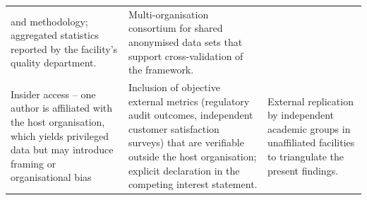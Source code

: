 \begin{table}[t]
\begin{tabularx}{\textwidth}{@{}p{3.5cm} X X@{}}
    and methodology; aggregated statistics reported by the facility's
    quality department. &
    Multi-organisation consortium for shared anonymised data sets that
    support cross-validation of the framework. \\
    \addlinespace
    Insider access -- one author is affiliated with the host organisation,
    which yields privileged data but may introduce framing or
    organisational bias &
    Inclusion of objective external metrics (regulatory audit outcomes,
    independent customer satisfaction surveys) that are verifiable
    outside the host organisation; explicit declaration in the competing
    interest statement. &
    External replication by independent academic groups in unaffiliated
    \MRO{} facilities to triangulate the present findings. \\
    \bottomrule
  \end{tabularx}
\end{table}

